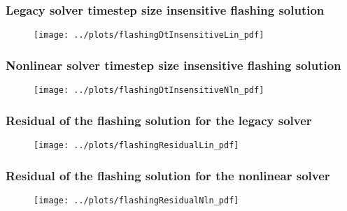 \documentclass[compress,xcolor=table]{beamer}
\begin{document}
\begin{frame}
\frametitle{Legacy solver timestep size insensitive flashing solution}

\begin{figure}[h!t]
\centering
\texttt{[image: ../plots/flashingDtInsensitiveLin\_pdf]}
\end{figure}

\end{frame}
\begin{frame}
\frametitle{Nonlinear solver timestep size insensitive flashing solution}

\begin{figure}[h!t]
\centering
\texttt{[image: ../plots/flashingDtInsensitiveNln\_pdf]}
\end{figure}

\end{frame}
\begin{frame}
\frametitle{Residual of the flashing solution for the legacy solver}

\begin{figure}[h!t]
\centering
\texttt{[image: ../plots/flashingResidualLin\_pdf]}
\end{figure}

\end{frame}
\begin{frame}
\frametitle{Residual of the flashing solution for the nonlinear solver}

\begin{figure}[h!t]
\centering
\texttt{[image: ../plots/flashingResidualNln\_pdf]}
\end{figure}

\end{frame}
\end{document}
